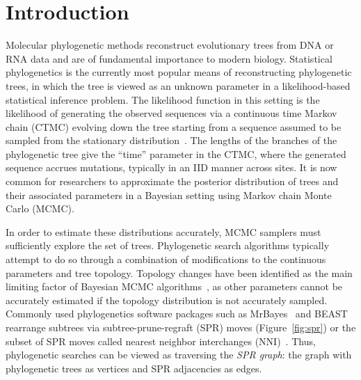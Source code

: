 \documentclass[11pt]{amsart}
\begin{document}
\maketitle

\pagebreak


\section{Introduction}
Molecular phylogenetic methods reconstruct evolutionary trees from DNA or RNA data and are of fundamental importance to modern biology.
Statistical phylogenetics is the currently most popular means of reconstructing phylogenetic trees, in which the tree is viewed as an unknown parameter in a likelihood-based statistical inference problem.
The likelihood function in this setting is the likelihood of generating the observed sequences via a continuous time Markov chain (CTMC) evolving down the tree starting from a sequence assumed to be sampled from the stationary distribution~\cite{felsenstein1981evolutionary}.
The lengths of the branches of the phylogenetic tree give the ``time'' parameter in the CTMC, where the generated sequence accrues mutations, typically in an IID manner across sites.
It is now common for researchers to approximate the posterior distribution of trees and their associated parameters in a Bayesian setting using Markov chain Monte Carlo (MCMC).

In order to estimate these distributions accurately, MCMC samplers must sufficiently explore the set of trees.
Phylogenetic search algorithms typically attempt to do so through a combination of modifications to the continuous parameters and tree topology.
Topology changes have been identified as the main limiting factor of Bayesian MCMC algorithms~\cite{lakner2008efficiency,hohna2012guided}, as other parameters cannot be accurately estimated if the topology distribution is not accurately sampled.
Commonly used phylogenetics software packages such as MrBayes~\cite{Ronquist2012-hi} and BEAST~\cite{bouckaert2014beast} rearrange subtrees via subtree-prune-regraft (SPR) moves (Figure~\ref{fig:spr}) or the subset of SPR moves called nearest neighbor interchanges (NNI)~\cite{robinson1971comparison}.
Thus, phylogenetic searches can be viewed as traversing the \emph{SPR graph}: the graph with phylogenetic trees as vertices and SPR adjacencies as edges.
\end{document}
